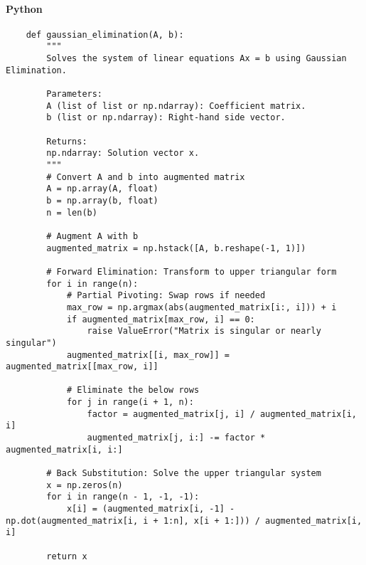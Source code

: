 \documentclass{article}
\begin{document}
            \paragraph{Python}
                \begin{verbatim}
    def gaussian_elimination(A, b):
        """
        Solves the system of linear equations Ax = b using Gaussian Elimination.

        Parameters:
        A (list of list or np.ndarray): Coefficient matrix.
        b (list or np.ndarray): Right-hand side vector.

        Returns:
        np.ndarray: Solution vector x.
        """
        # Convert A and b into augmented matrix
        A = np.array(A, float)
        b = np.array(b, float)
        n = len(b)

        # Augment A with b
        augmented_matrix = np.hstack([A, b.reshape(-1, 1)])

        # Forward Elimination: Transform to upper triangular form
        for i in range(n):
            # Partial Pivoting: Swap rows if needed
            max_row = np.argmax(abs(augmented_matrix[i:, i])) + i
            if augmented_matrix[max_row, i] == 0:
                raise ValueError("Matrix is singular or nearly singular")
            augmented_matrix[[i, max_row]] = augmented_matrix[[max_row, i]]

            # Eliminate the below rows
            for j in range(i + 1, n):
                factor = augmented_matrix[j, i] / augmented_matrix[i, i]
                augmented_matrix[j, i:] -= factor * augmented_matrix[i, i:]

        # Back Substitution: Solve the upper triangular system
        x = np.zeros(n)
        for i in range(n - 1, -1, -1):
            x[i] = (augmented_matrix[i, -1] - np.dot(augmented_matrix[i, i + 1:n], x[i + 1:])) / augmented_matrix[i, i]

        return x
                \end{verbatim}
\end{document}
